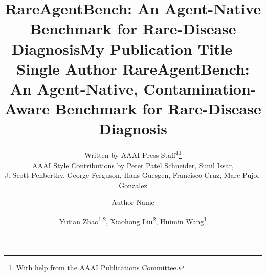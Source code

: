 \documentclass[letterpaper]{article} %
\title{
RareAgentBench: An Agent-Native Benchmark for Rare-Disease Diagnosis}
\author{
    Written by AAAI Press Staff\textsuperscript{\rm 1}\thanks{With help from the AAAI Publications Committee.}\\
    AAAI Style Contributions by Peter Patel Schneider,
    Sunil Issar,\\
    J. Scott Penberthy,
    George Ferguson,
    Hans Guesgen,
    Francisco Cruz\equalcontrib\corresponding,
    Marc Pujol-Gonzalez\equalcontrib\corresponding
}
\title{My Publication Title --- Single Author}
\author {
    Author Name
}
\title{
RareAgentBench: An Agent-Native, Contamination-Aware Benchmark for Rare-Disease Diagnosis
}
\author {
    Yutian Zhao\textsuperscript{\rm 1,\rm 2}, %
    Xiaohong Liu\textsuperscript{\rm 2},
    Huimin Wang\textsuperscript{\rm 1}\corresponding
}
\begin{document}
\maketitle

\begin{abstract}


\end{abstract}
\end{document}
